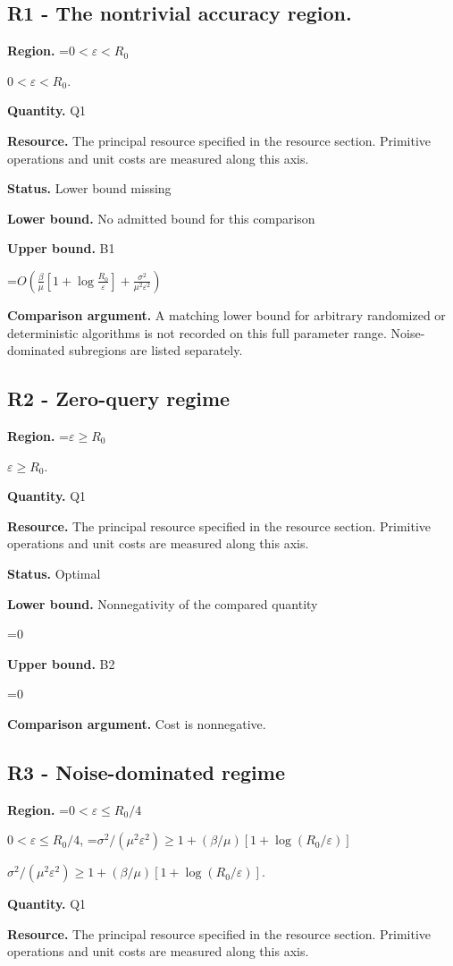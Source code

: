 \documentclass[10pt,a4paper]{article}
\newcommand{\AtlasMath}[1]{\par\begingroup\centering\setbox0=\hbox{$\displaystyle #1$}\ifdim\wd0>1.4\linewidth\typeout{ATLAS WIDE FORMULA: \the\wd0}\fi\ifdim\wd0>\linewidth\resizebox{\linewidth}{!}{\box0}\else\box0\fi\par\endgroup}
\newcommand{\AtlasInlineMath}[1]{\begingroup\setbox0=\hbox{$#1$}\ifdim\wd0>.4\linewidth\endgroup\AtlasMath{#1}\else\endgroup$#1$\fi}
\begin{document}
\subsection{R1 - The nontrivial accuracy region.}
\textbf{Region.} \AtlasInlineMath{0<\varepsilon<R_0}.

\textbf{Quantity.} Q1

\textbf{Resource.} The principal resource specified in the resource section. Primitive operations and unit costs are measured along this axis.

\textbf{Status.} Lower bound missing

\textbf{Lower bound.} No admitted bound for this comparison

\textbf{Upper bound.} B1

\AtlasMath{O\!\left(\frac{\beta}{\mu}\left[1+\log\frac{R_0}{\varepsilon}\right]+\frac{\sigma^2}{\mu^2\varepsilon^2}\right)}
\textbf{Comparison argument.} A matching lower bound for arbitrary randomized or deterministic algorithms is not recorded on this full parameter range. Noise-dominated subregions are listed separately.

\subsection{R2 - Zero-query regime}
\textbf{Region.} \AtlasInlineMath{\varepsilon\ge R_0}.

\textbf{Quantity.} Q1

\textbf{Resource.} The principal resource specified in the resource section. Primitive operations and unit costs are measured along this axis.

\textbf{Status.} Optimal

\textbf{Lower bound.} Nonnegativity of the compared quantity

\AtlasMath{0}
\textbf{Upper bound.} B2

\AtlasMath{0}
\textbf{Comparison argument.} Cost is nonnegative.

\subsection{R3 - Noise-dominated regime}
\textbf{Region.} \AtlasInlineMath{0<\varepsilon\le R_0/4}, \AtlasInlineMath{\sigma^2/(\mu^2\varepsilon^2)\ge1+(\beta/\mu)[1+\log(R_0/\varepsilon)]}.

\textbf{Quantity.} Q1

\textbf{Resource.} The principal resource specified in the resource section. Primitive operations and unit costs are measured along this axis.
\end{document}
